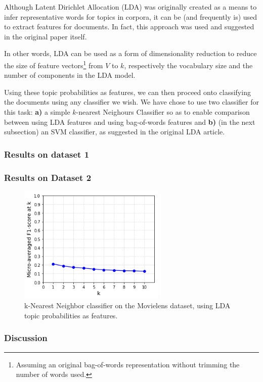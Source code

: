 Although Latent Dirichlet Allocation (LDA) \citep{blei_etal_2003} was originally created as a means to infer representative words for topics in corpora, it can be (and frequently is) used to extract features for documents. In fact, this approach was used and suggested in the original paper itself.

In other words, LDA can be used as a form of dimensionality reduction to reduce the size of feature vectors\footnote{Assuming an original bag-of-words representation without trimming the number of words used.} from $V$ to $k$, respectively the vocabulary size and the number of components in the LDA model.

Using these topic probabilities as features, we can then proceed onto classifying the documents using any classifier we wish. We have chose to use two classifier for this task: \textbf{a)} a simple $k$-nearest Neighours Classifier so as to enable comparison between using LDA features and using bag-of-words features and \textbf{b)} (in the next subsection) an SVM classifier, as suggested in the original LDA article.

\subsubsection{Results on dataset 1}

\subsubsection{Results on Dataset 2}

\begin{figure}[H]
    \centering
    \includegraphics[width=7cm]{chapters/05_experiments/images/knn-lda-movielens.png}
    \caption{k-Nearest Neighbor classifier on the Movielens dataset, using LDA topic probabilities as features.}
    \label{fig:knn_lda_movielens}
\end{figure}

\subsubsection{Discussion}

